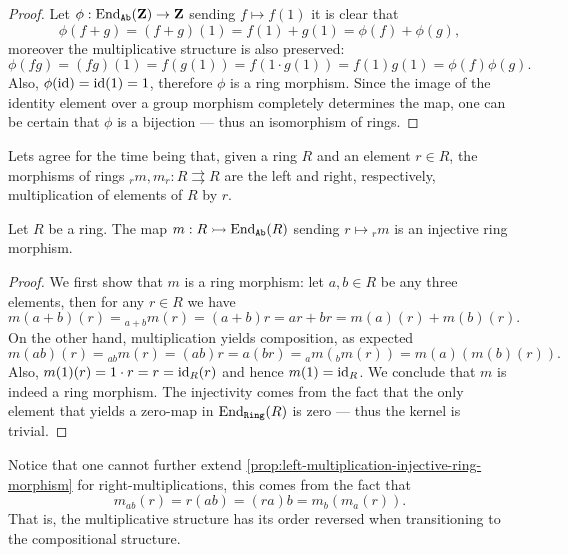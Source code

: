 %
\begin{proof}
    Let \(\phi: \operatorname{End}_{{\texttt{Ab}}}(\mathbf{Z}) \to \mathbf{Z}\) sending \(f \mapsto f(1)\) it is clear that
    \[
        \phi(f + g) = (f + g)(1) = f(1) + g(1) = \phi(f) + \phi(g),
    \]
    moreover the multiplicative structure is also preserved:
    \[
        \phi(f g) = (f g)(1) = f(g(1)) = f(1 \cdot g(1)) = f(1) g(1) = \phi(f) \phi(g).
    \]
    Also, \(\phi(\operatorname{id}) = \operatorname{id}(1) = 1\), therefore \(\phi\) is a ring morphism. Since
    the image of the identity element over a group morphism completely determines
    the map, one can be certain that \(\phi\) is a bijection --- thus an isomorphism
    of rings.
\end{proof}
%

Lets agree for the time being that, given a ring \(R\) and an element
\(r \in R\), the morphisms of rings \({}_rm, m_r: R \rightrightarrows R\) are
the left and right, respectively, multiplication of elements of \(R\) by \(r\).

%
\begin{proposition}
    \label{prop:left-multiplication-injective-ring-morphism}
    Let \(R\) be a ring. The map \(m: R \rightarrowtail \operatorname{End}_{{\texttt{Ab}}}(R)\) sending
    \(r \mapsto {}_rm\) is an injective ring morphism.
\end{proposition}
%

%
\begin{proof}
    We first show that \(m\) is a ring morphism: let \(a, b \in R\) be any three
    elements, then for any \(r \in R\) we have
    \[
        m(a + b)(r) = {}_{a + b}m(r) = (a + b)r = a r + b r = m(a)(r) + m(b)(r).
    \]
    On the other hand, multiplication yields composition, as expected
    \[
        m(a b)(r) = {}_{a b}m(r) = (a b) r = a (b r) = {}_am({}_bm(r)) = m(a)(m(b)(r)).
    \]
    Also, \(m(1)(r) = 1 \cdot r = r = \operatorname{id}_R(r)\) and hence \(m(1) = \operatorname{id}_R\). We
    conclude that \(m\) is indeed a ring morphism. The injectivity comes from the
    fact that the only element that yields a zero-map in \(\operatorname{End}_{{\texttt{Ring}}}(R)\) is zero
    --- thus the kernel is trivial.
\end{proof}
%

%
\begin{remark}
    \label{rem:ring-right-multiplication-lacks-conditions}
    Notice that one cannot further extend
    \cref{prop:left-multiplication-injective-ring-morphism} for
    right-multiplications, this comes from the fact that
    \[
        m_{a b}(r) = r (a b) = (r a) b = m_b(m_a(r)).
    \]
    That is, the multiplicative structure has its order reversed when transitioning
    to the compositional structure.
\end{remark}
%

